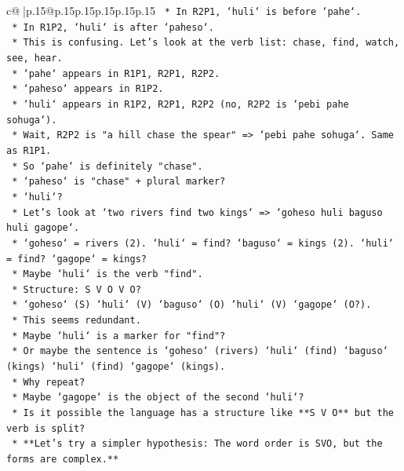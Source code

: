 \documentclass{article}
\begin{document}
{\begin{supertabular}{c@{$\;$}|p{.15\linewidth}@{}p{.15\linewidth}p{.15\linewidth}p{.15\linewidth}p{.15\linewidth}p{.15\linewidth}}
{{{\texttt{                *   In R2P1, `huli` is before `pahe`.} \\
\texttt{                *   In R1P2, `huli` is after `paheso`.} \\
\texttt{                *   This is confusing. Let's look at the verb list: chase, find, watch, see, hear.} \\
\texttt{                *   `pahe` appears in R1P1, R2P1, R2P2.} \\
\texttt{                *   `paheso` appears in R1P2.} \\
\texttt{                *   `huli` appears in R1P2, R2P1, R2P2 (no, R2P2 is `pebi pahe sohuga`).} \\
\texttt{                *   Wait, R2P2 is "a hill chase the spear" => `pebi pahe sohuga`. Same as R1P1.} \\
\texttt{                *   So `pahe` is definitely "chase".} \\
\texttt{                *   `paheso` is "chase" + plural marker?} \\
\texttt{                *   `huli`?} \\
\texttt{                *   Let's look at `two rivers find two kings` => `goheso huli baguso huli gagope`.} \\
\texttt{                    *   `goheso` = rivers (2). `huli` = find? `baguso` = kings (2). `huli` = find? `gagope` = kings?} \\
\texttt{                    *   Maybe `huli` is the verb "find".} \\
\texttt{                    *   Structure: S V O V O?} \\
\texttt{                    *   `goheso` (S) `huli` (V) `baguso` (O) `huli` (V) `gagope` (O?).} \\
\texttt{                    *   This seems redundant.} \\
\texttt{                    *   Maybe `huli` is a marker for "find"?} \\
\texttt{                    *   Or maybe the sentence is `goheso` (rivers) `huli` (find) `baguso` (kings) `huli` (find) `gagope` (kings).} \\
\texttt{                    *   Why repeat?} \\
\texttt{                    *   Maybe `gagope` is the object of the second `huli`?} \\
\texttt{                    *   Is it possible the language has a structure like **S V O** but the verb is split?} \\
\texttt{    *   **Let's try a simpler hypothesis: The word order is SVO, but the forms are complex.**} \\
}}}
\end{supertabular}}
\end{document}
